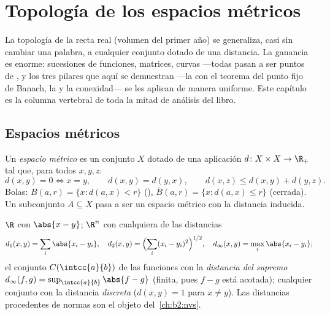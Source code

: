 \chapter{Topología de los espacios métricos}\label{ch:b2:metric}

La topología de la recta real (volumen del primer año) se generaliza,
casi sin cambiar una palabra, a cualquier conjunto dotado de una
distancia. La ganancia es enorme: sucesiones de funciones, matrices,
curvas ---todas pasan a ser puntos de , y los tres
pilares que aquí se demuestran ---la  con el teorema del
punto fijo de Banach, la  y la conexidad--- se les
aplican de manera uniforme. Este capítulo es la columna vertebral de
toda la mitad de análisis del libro.

\section{Espacios métricos}

\begin{definition}\label{def:b2:metric:def}
Un \emph{espacio métrico} es un conjunto $X$
dotado de una aplicación $d \colon X \times X \to \R_+$ tal que, para
todos $x, y, z$:
\[
d(x,y) = 0 \iff x = y,
\qquad
d(x,y) = d(y,x),
\qquad
d(x,z) \leq d(x,y) + d(y,z).
\]
Bolas: $B(a, r) = \{x : d(a,x) < r\}$ (), $\overline B(a,r) =
\{x : d(a,x) \leq r\}$ (cerrada). Un subconjunto $A \subseteq X$ pasa
a ser un espacio métrico con la distancia inducida.
\end{definition}

\begin{example}\label{ex:b2:metric:examples}
$\R$ con $\abs{x - y}$; $\R^n$ con cualquiera de las distancias
\[
d_1(x,y) = \sum_i \abs{x_i - y_i},
\quad
d_2(x,y) = \Bigl(\sum_i (x_i - y_i)^2\Bigr)^{1/2},
\quad
d_\infty(x,y) = \max_i \abs{x_i - y_i};
\]
el conjunto $C(\intcc{a}{b})$ de las funciones  con la
\emph{distancia del supremo} $d_\infty(f, g) = \sup_{\intcc{a}{b}}
\abs{f - g}$ (finita, pues $f - g$ está acotada); cualquier conjunto
con la distancia \emph{discreta} ($d(x,y) = 1$ para $x \neq y$). Las
distancias procedentes de normas son el objeto del~\cref{ch:b2:nvs}.
\end{example}


